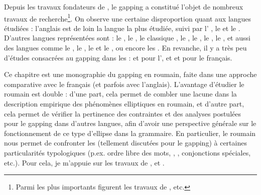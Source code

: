 Depuis les travaux fondateurs de \citet{Ross1967,Ross1970}, le gapping a constitué l’objet de nombreux travaux de recherche\footnote{
 Parmi les plus importants figurent les travaux de \citet{Koutsoudas1971,Jackendoff1971,Maling1972,Hankamer1973,Hudson1976,Hudson1989,Kuno1976,Neijt1979,Siegel1984,Oehrle1987,Jayaseelan1990,Steedman1990,Steedman2000,Gardent1991,Kehler1994,Johnson1996/2004,Johnson2009,Kim1997,Kim1998,Kim2006,Hartmann2000,ZoernerEtAl2000,Coppock2001,Carlson2001,Carlson2002,Lin2002,LopezEtAl2003,CarlsonEtAl2005,Chaves2005,Winkler2005,Reich2006,Hernandez2007,Hoyt2008,Vicente2010,Boone2014}, etc.}. On observe une certaine disproportion quant aux langues étudiées : l’anglais est de loin la langue la plus étudiée, suivi par l’ \citep{Hartmann2000,Winkler2005,Osborne2006,Reich2006,Repp2009}, le  et le  \citep{Kim1997,Kim1998,AbeEtAl1999,Lee2005,Yosuke2009}. D’autres langues représentées sont : le  \citep{Neijt1979,Aelbrecht2009}, le  \citep{Paul1999,Tang2001,RuixiRessy2008}, le  classique \citep{GaetaEtAl2001}, le  \citep{Panhuis1979}, le  \citep{Kazenin2001,Agafonova2014}, le  \citep{Ince2009}, le  \citep{Farudi2013}, et aussi des langues comme le  \citep{Pulte1971}, le  \citep{Rosenbaum1977}, le  et le  \citep{Kazenin2001}, ou encore les  \citep{ManusEtAl2011}. En revanche, il y a très peu d’études consacrées au gapping dans les  : \citet{Tran2010} et \citet{Centeno2011} pour l’, et \citet{Zribi-Hertz1986} et \citet{AbeilleEtAl2010} pour le français.

Ce chapitre est une monographie du gapping en roumain, faite dans une approche comparative avec le français (et parfois avec l’anglais). L’avantage d’étu\-dier le roumain est double : d’une part, cela permet de combler une lacune dans la description empirique des phénomènes elliptiques en roumain, et d’autre part, cela permet de vérifier la pertinence des contraintes et des analyses postulées pour le gapping dans d’autres langues, afin d’avoir une perspective générale sur le fonctionnement de ce type d’ellipse dans la grammaire. En particulier, le roumain nous permet de confronter les  (tellement discutées pour le gapping) à certaines particularités typologiques (p.ex. ordre libre des mots, , , conjonctions spéciales, etc.). Pour cela, je m’appuie sur les travaux de \citet{Bilbiie2009}, \citet{AbeilleEtAl2010} et \citet{AbeilleEtAl2014}. 

